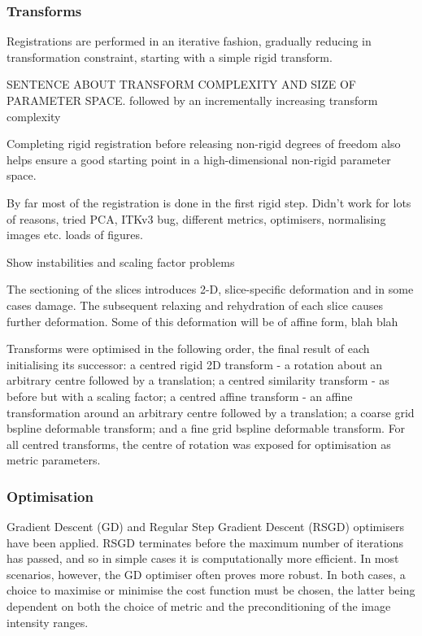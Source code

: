    \subsubsection{Transforms} %
    \label{ssub:transforms}
      Registrations are performed in an iterative fashion, gradually reducing in transformation constraint, starting with a simple rigid transform.
      
SENTENCE ABOUT TRANSFORM COMPLEXITY AND SIZE OF PARAMETER SPACE.  followed by an incrementally increasing transform complexity 

Completing rigid registration before releasing non-rigid degrees of freedom also helps ensure a good starting point in a high-dimensional non-rigid parameter space. 

By far most of the registration is done in the first rigid step. Didn't work for lots of reasons, tried PCA, ITKv3 bug, different metrics, optimisers, normalising images etc. loads of figures.

Show instabilities and scaling factor problems

The sectioning of the slices introduces 2-D, slice-specific deformation and in some cases damage. The subsequent relaxing and rehydration of each slice causes further deformation. Some of this deformation will be of affine form, blah blah

        Transforms were optimised in the following order, the final result of each initialising its successor: a centred rigid 2D transform - a rotation about an arbitrary centre followed by a translation; a centred similarity transform - as before but with a scaling factor; a centred affine transform - an affine transformation around an arbitrary centre followed by a translation; a coarse grid bspline deformable transform; and a fine grid bspline deformable transform. For all centred transforms, the centre of rotation was exposed for optimisation as metric parameters.
    
    \subsubsection{Optimisation} %
    \label{ssub:optimisation}
      Gradient Descent (GD) and Regular Step Gradient Descent (RSGD) optimisers have been applied. RSGD terminates before the maximum number of iterations has passed, and so in simple cases it is computationally more efficient. In most scenarios, however, the GD optimiser often proves more robust. In both cases, a choice to maximise or minimise the cost function must be chosen, the latter being dependent on both the choice of metric and the preconditioning of the image intensity ranges.

